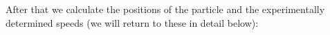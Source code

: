 After that we calculate the positions of the particle and the experimentally determined speeds (we will return to these in detail below):